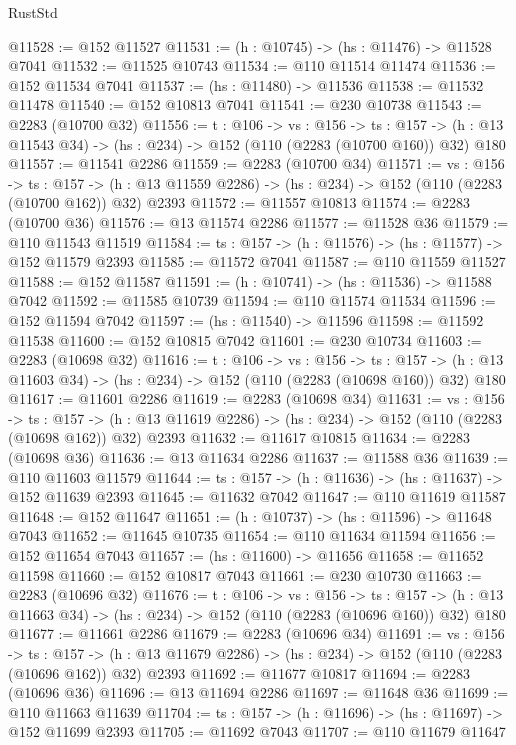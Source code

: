 \begin{lexlean}{RustStd}
\begin{coremodule}
@11528 := @152 @11527
@11531 := (h : @10745) -> (hs : @11476) -> @11528 @7041
@11532 := @11525 @10743
@11534 := @110 @11514 @11474
@11536 := @152 @11534 @7041
@11537 := (hs : @11480) -> @11536
@11538 := @11532 @11478
@11540 := @152 @10813 @7041
@11541 := @230 @10738
@11543 := @2283 (@10700 @32)
@11556 := {t : @106} ->
  {vs : @156} ->
  {ts : @157} -> (h : @13 @11543 @34) -> (hs : @234) -> @152 (@110 (@2283 (@10700 @160)) @32) @180
@11557 := @11541 @2286
@11559 := @2283 (@10700 @34)
@11571 := {vs : @156} ->
  {ts : @157} ->
  (h : @13 @11559 @2286) -> (hs : @234) -> @152 (@110 (@2283 (@10700 @162)) @32) @2393
@11572 := @11557 @10813
@11574 := @2283 (@10700 @36)
@11576 := @13 @11574 @2286
@11577 := @11528 @36
@11579 := @110 @11543 @11519
@11584 := {ts : @157} -> (h : @11576) -> (hs : @11577) -> @152 @11579 @2393
@11585 := @11572 @7041
@11587 := @110 @11559 @11527
@11588 := @152 @11587
@11591 := (h : @10741) -> (hs : @11536) -> @11588 @7042
@11592 := @11585 @10739
@11594 := @110 @11574 @11534
@11596 := @152 @11594 @7042
@11597 := (hs : @11540) -> @11596
@11598 := @11592 @11538
@11600 := @152 @10815 @7042
@11601 := @230 @10734
@11603 := @2283 (@10698 @32)
@11616 := {t : @106} ->
  {vs : @156} ->
  {ts : @157} -> (h : @13 @11603 @34) -> (hs : @234) -> @152 (@110 (@2283 (@10698 @160)) @32) @180
@11617 := @11601 @2286
@11619 := @2283 (@10698 @34)
@11631 := {vs : @156} ->
  {ts : @157} ->
  (h : @13 @11619 @2286) -> (hs : @234) -> @152 (@110 (@2283 (@10698 @162)) @32) @2393
@11632 := @11617 @10815
@11634 := @2283 (@10698 @36)
@11636 := @13 @11634 @2286
@11637 := @11588 @36
@11639 := @110 @11603 @11579
@11644 := {ts : @157} -> (h : @11636) -> (hs : @11637) -> @152 @11639 @2393
@11645 := @11632 @7042
@11647 := @110 @11619 @11587
@11648 := @152 @11647
@11651 := (h : @10737) -> (hs : @11596) -> @11648 @7043
@11652 := @11645 @10735
@11654 := @110 @11634 @11594
@11656 := @152 @11654 @7043
@11657 := (hs : @11600) -> @11656
@11658 := @11652 @11598
@11660 := @152 @10817 @7043
@11661 := @230 @10730
@11663 := @2283 (@10696 @32)
@11676 := {t : @106} ->
  {vs : @156} ->
  {ts : @157} -> (h : @13 @11663 @34) -> (hs : @234) -> @152 (@110 (@2283 (@10696 @160)) @32) @180
@11677 := @11661 @2286
@11679 := @2283 (@10696 @34)
@11691 := {vs : @156} ->
  {ts : @157} ->
  (h : @13 @11679 @2286) -> (hs : @234) -> @152 (@110 (@2283 (@10696 @162)) @32) @2393
@11692 := @11677 @10817
@11694 := @2283 (@10696 @36)
@11696 := @13 @11694 @2286
@11697 := @11648 @36
@11699 := @110 @11663 @11639
@11704 := {ts : @157} -> (h : @11696) -> (hs : @11697) -> @152 @11699 @2393
@11705 := @11692 @7043
@11707 := @110 @11679 @11647

\end{coremodule}
\end{lexlean}
